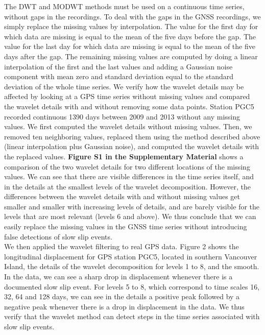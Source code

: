 \documentclass{article}
\begin{document}
The DWT and MODWT methods must be used on a continuous time series, without gaps in the recordings. To deal with the gaps in the GNSS recordings, we simply replace the missing values by interpolation. The value for the first day for which data are missing is equal to the mean of the five days before the gap. The value for the last day for which data are missing is equal to the mean of the five days after the gap. The remaining missing values are computed by doing a linear interpolation of the first and the last values and adding a Gaussian noise component with mean zero and standard deviation equal to the standard deviation of the whole time series. We verify how the wavelet details may be affected by looking at a GPS time series without missing values and compared the wavelet details with and without removing some data points. Station PGC5 recorded continuous 1390 days between 2009 and 2013 without any missing values. We first computed the wavelet details without missing values. Then, we removed ten neighboring values, replaced them using the method described above (linear interpolation plus Gaussian noise), and computed the wavelet details with the replaced values. \textbf{Figure S1 in the Supplementary Material} shows a comparison of the two wavelet details for two different locations of the missing values. We can see that there are visible differences in the time series itself, and in the details at the smallest levels of the wavelet decomposition. However, the differences between the wavelet details with and without missing values get smaller and smaller with increasing levels of details, and are barely visible for the levels that are most relevant (levels 6 and above). We thus conclude that we can easily replace the missing values in the GNSS time series without introducing false detections of slow slip events. \\

We then applied the wavelet filtering to real GPS data. Figure 2 shows the longitudinal displacement for GPS station PGC5, located in southern Vancouver Island, the details of the wavelet decomposition for levels 1 to 8, and the smooth. In the data, we can see a sharp drop in displacement whenever there is a documented slow slip event. For levels 5 to 8, which correspond to time scales 16, 32, 64 and 128 days, we can see in the details a positive peak followed by a negative peak whenever there is a drop in displacement in the data. We thus verify that the wavelet method can detect steps in the time series associated with slow slip events. \\
\end{document}
